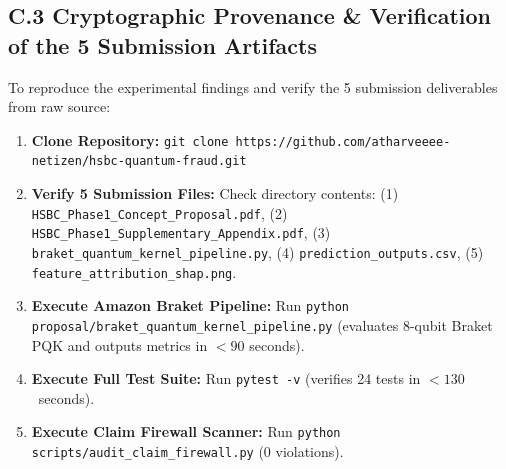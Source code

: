 \documentclass[10pt,a4paper]{article}
\begin{document}
\subsection*{C.3 Cryptographic Provenance \& Verification of the 5 Submission Artifacts}
To reproduce the experimental findings and verify the 5 submission deliverables from raw source:
\begin{enumerate}[leftmargin=*,itemsep=0.4pt,topsep=1pt]
\item \textbf{Clone Repository:} \texttt{git clone https://github.com/atharveeee-netizen/hsbc-quantum-fraud.git}
\item \textbf{Verify 5 Submission Files:} Check directory contents: (1) \texttt{HSBC\_Phase1\_Concept\_Proposal.pdf}, (2) \texttt{HSBC\_Phase1\_Supplementary\_Appendix.pdf}, (3) \texttt{braket\_quantum\_kernel\_pipeline.py}, (4) \texttt{prediction\_outputs.csv}, (5) \texttt{feature\_attribution\_shap.png}.
\item \textbf{Execute Amazon Braket Pipeline:} Run \texttt{python proposal/braket\_quantum\_kernel\_pipeline.py} (evaluates 8-qubit Braket PQK and outputs metrics in $<90$ seconds).
\item \textbf{Execute Full Test Suite:} Run \texttt{pytest -v} (verifies 24 tests in $<130$~seconds).
\item \textbf{Execute Claim Firewall Scanner:} Run \texttt{python scripts/audit\_claim\_firewall.py} (0 violations).
\end{enumerate}
\end{document}
